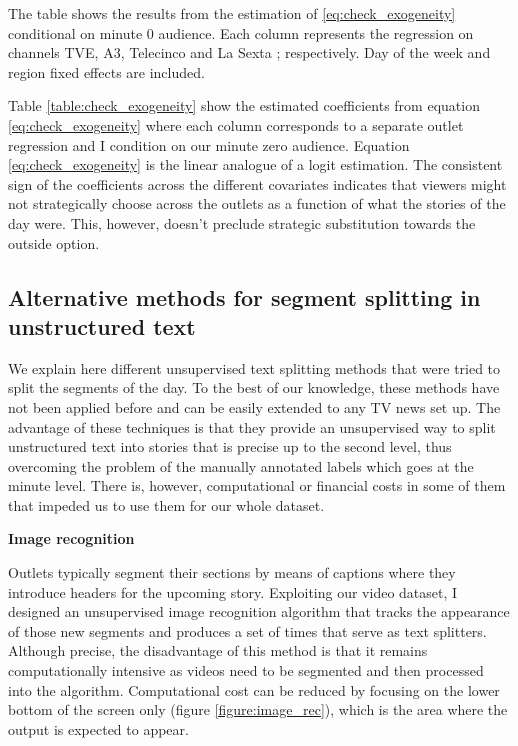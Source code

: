 \documentclass[12pt]{article}
\begin{document}
	
	
	
	\begin{table}
		\centering
		
		\caption{The table shows the results from the estimation of \ref{eq:check_exogeneity} conditional on minute 0 audience. Each column represents the regression on channels TVE, A3, Telecinco and La Sexta ; respectively. Day of the week and region fixed effects are included. }
		\label{table:check_exogeneity}
	\end{table}
	
	
	Table \ref{table:check_exogeneity} show the estimated coefficients from equation \ref{eq:check_exogeneity} where each column corresponds to a separate outlet regression and I condition on our minute zero audience. Equation \ref{eq:check_exogeneity} is the linear analogue of a logit estimation. The consistent sign of the coefficients across the different covariates indicates that viewers might not strategically choose across the outlets as a function of what the stories of the day were. This, however, doesn't preclude strategic substitution towards the outside option. 
	
	
	
	
	
	\subsection{Alternative methods for segment splitting in unstructured text}
	
	We explain here different unsupervised text splitting methods that were tried to split the segments of the day. To the best of our knowledge, these methods have not been applied before and can be easily extended to any TV news set up. The advantage of these techniques is that they provide an unsupervised way to split unstructured text into stories that is precise up to the second level, thus overcoming the problem of the manually annotated labels which goes at the minute level. There is, however, computational or financial costs in some of them that impeded us to use them for our whole dataset.
	
	\textbf{Image recognition}
	
	Outlets typically segment their sections by means of captions where they introduce headers for the upcoming story. Exploiting our video dataset, I designed an unsupervised image recognition algorithm that tracks the appearance of those new segments and produces a set of times that serve as text splitters. Although precise, the disadvantage of this method is that it remains computationally intensive as videos need to be segmented and then processed into the algorithm. Computational cost can be reduced by focusing on the lower bottom of the screen  only (figure \ref{figure:image_rec}), which is the area where the output is expected to appear.
	
\end{document}
